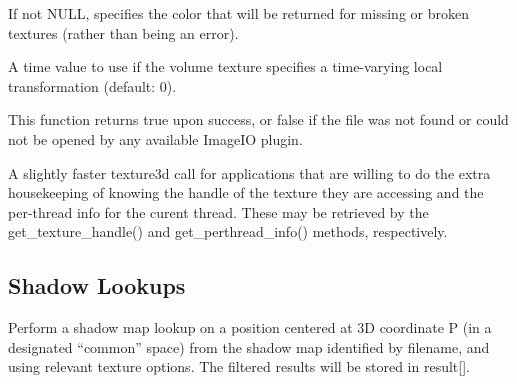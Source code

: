 \vspace{-24pt}
\vspace{10pt}
If not NULL, specifies the color that will be returned for missing or
broken textures (rather than being an error).
\apiend

\vspace{-24pt}
\vspace{10pt}
A time value to use if the volume texture specifies a time-varying
local transformation (default: 0).
\apiend

This function returns {\cf true} upon success, or {\cf false} if the
file was not found or could not be opened by any available ImageIO
plugin.

\apiend

A slightly faster {\cf texture3d} call for applications that are willing
to do the extra housekeeping of knowing the handle of the texture they
are accessing and the per-thread info for the curent thread.  These
may be retrieved by the {\cf get_texture_handle()} and 
{\cf get_perthread_info()} methods, respectively.
\apiend


\subsection{Shadow Lookups}
\label{sec:texturesys:api:shadow}


Perform a shadow map lookup on a position centered at 3D
coordinate {\cf P} (in a designated ``common'' space) from the shadow map identified by
{\cf filename}, and using relevant texture {\cf options}.  The filtered
results will be stored in {\cf result[]}.

